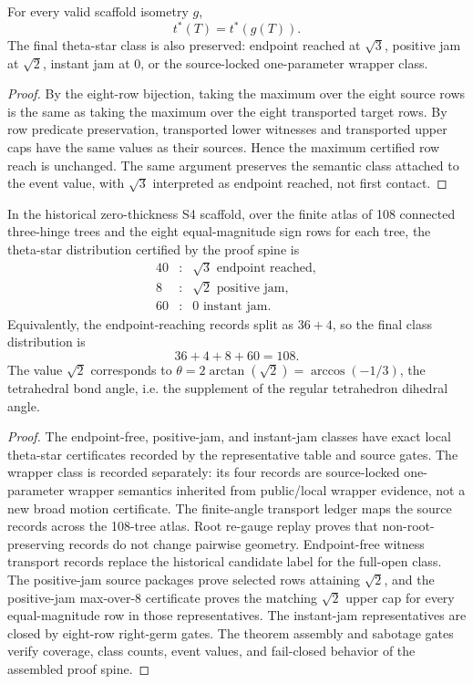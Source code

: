 \begin{theorem}
For every valid scaffold isometry \(g\),
\[
  t^*(T)=t^*(g(T)).
\]
The final theta-star class is also preserved: endpoint reached at \(\sqrt{3}\), positive jam at \(\sqrt{2}\), instant jam at \(0\), or the source-locked one-parameter wrapper class.
\end{theorem}

\begin{proof}
By the eight-row bijection, taking the maximum over the eight source rows is the same as taking the maximum over the eight transported target rows.  By row predicate preservation, transported lower witnesses and transported upper caps have the same values as their sources.  Hence the maximum certified row reach is unchanged.  The same argument preserves the semantic class attached to the event value, with \(\sqrt{3}\) interpreted as endpoint reached, not first contact.
\end{proof}

\begin{theorem}
In the historical zero-thickness S4 scaffold, over the finite atlas of 108 connected three-hinge trees and the eight equal-magnitude sign rows for each tree, the theta-star distribution certified by the proof spine is
\[
\begin{array}{rcl}
  40 &:& \sqrt{3} \text{ endpoint reached},\\
  8  &:& \sqrt{2} \text{ positive jam},\\
  60 &:& 0 \text{ instant jam}.
\end{array}
\]
Equivalently, the endpoint-reaching records split as \(36+4\), so the final class distribution is
\[
  36+4+8+60=108.
\]
The value \(\sqrt{2}\) corresponds to \(\theta = 2\arctan(\sqrt{2}) = \arccos(-1/3)\), the tetrahedral bond angle, i.e. the supplement of the regular tetrahedron dihedral angle.
\end{theorem}

\begin{proof}
The endpoint-free, positive-jam, and instant-jam classes have exact local theta-star certificates recorded by the representative table and source gates.  The wrapper class is recorded separately: its four records are source-locked one-parameter wrapper semantics inherited from public/local wrapper evidence, not a new broad motion certificate.  The finite-angle transport ledger maps the source records across the 108-tree atlas.  Root re-gauge replay proves that non-root-preserving records do not change pairwise geometry.  Endpoint-free witness transport records replace the historical candidate label for the full-open class.  The positive-jam source packages prove selected rows attaining \(\sqrt{2}\), and the positive-jam max-over-8 certificate proves the matching \(\sqrt{2}\) upper cap for every equal-magnitude row in those representatives.  The instant-jam representatives are closed by eight-row right-germ gates.  The theorem assembly and sabotage gates verify coverage, class counts, event values, and fail-closed behavior of the assembled proof spine.
\end{proof}
